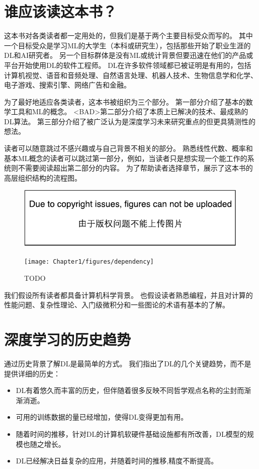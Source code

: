 \section{谁应该读这本书？}
\label{sec:who_should_read_this_book}

这本书对各类读者都一定用处的，但我们是基于两个主要目标受众而写的。
其中一个目标受众是学习\gls{ML}的大学生（本科或研究生），包括那些开始了职业生涯的\gls{DL}和\gls{AI}研究者。
另一个目标群体是没有\gls{ML}或统计背景但要迅速在他们的产品或平台开始使用\gls{DL}的软件工程师。
\gls{DL}在许多软件领域都已被证明是有用的，包括计算机视觉、语音和音频处理、自然语言处理、机器人技术、生物信息学和化学、电子游戏、搜索引擎、网络广告和金融。


为了最好地适应各类读者，这本书被组织为三个部分。
第一部分介绍了基本的数学工具和\gls{ML}的概念。
<BAD>第二部分介绍了本质上已解决的技术、最成熟的\gls{DL}算法。
第三部分介绍了被广泛认为是深度学习未来研究重点的但更具猜测性的想法。

读者可以随意跳过不感兴趣或与自己背景不相关的部分。
熟悉线性代数、概率和基本\gls{ML}概念的读者可以跳过第一部分，例如，当读者只是想实现一个能工作的系统则不需要阅读超出第二部分的内容。
为了帮助读者选择章节，展示了这本书的高层组织结构的流程图。
\begin{figure}[!htb]
\ifOpenSource
\centerline{\includegraphics{figure.pdf}}
\else
\centerline{\texttt{[image: Chapter1/figures/dependency]}}
\fi
\caption{TODO}
\label{fig:chap1_dependency}
\end{figure}


我们假设所有读者都具备计算机科学背景。
也假设读者熟悉编程，并且对计算的性能问题、复杂性理论、入门级微积分和一些图论的术语有基本的了解。

\section{深度学习的历史趋势}
\label{sec:historical_trends_in_deep_learning}
通过历史背景了解\gls{DL}是最简单的方式。
我们指出了\gls{DL}的几个关键趋势，而不是提供详细的历史：
\begin{itemize}
 \item \gls{DL}有着悠久而丰富的历史，但伴随着很多反映不同哲学观点名称的尘封而渐渐消逝。
 \item 可用的训练数据的量已经增加，使得\gls{DL}变得更加有用。
 \item 随着时间的推移，针对\gls{DL}的计算机软硬件基础设施都有所改善，\gls{DL}模型的规模也随之增长。
 \item \gls{DL}已经解决日益复杂的应用，并随着时间的推移,精度不断提高。
\end{itemize}

